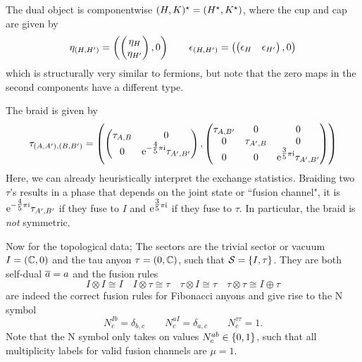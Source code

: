 The dual object is componentwise $\dualspace{\fermpair{H}{K}} = \fermpair{\dualspace{H}}{\dualspace{K}}$, where the cup and cap are given by
\begin{equation}
    \eta_{\fermpair{H}{H'}}
    = \fermpair{\begin{pmatrix}\eta_H \\ \eta_{H'}\end{pmatrix}}{0}
    \qquad
    \epsilon_{\fermpair{H}{H'}}
    = \fermpair{\begin{pmatrix} \epsilon_H & \epsilon_{H'}\end{pmatrix}}{0}
\end{equation}
which is structurally very similar to fermions, but note that the zero maps in the second components have a different type.

The braid is given by
\begin{equation}
    \tau_{\fermpair{A}{A'}, \fermpair{B}{B'}}
    = \fermpair{
        \begin{pmatrix} \tau_{A,B} & 0 \\ 0 & \eto{-\tfrac{4}{5}\pi\im} \tau_{A',B'} \end{pmatrix}
    }{
        \begin{pmatrix} \tau_{A,B'} & 0 & 0\\ 0 & \tau_{A',B} & 0 \\ 0 & 0 & \eto{\tfrac{3}{5}\pi\im} \tau_{A',B'} \end{pmatrix}
    }
\end{equation}
Here, we can already heuristically interpret the exchange statistics.
%
Braiding two $\tau$'s results in a phase that depends on the joint state or ``fusion channel", it is $\mathrm{e}^{-\tfrac{4}{5}\pi\mathrm{i}} \tau_{A',B'}$ if they fuse to $I$ and $\mathrm{e}^{\tfrac{3}{5}\pi\mathrm{i}}$ if they fuse to $\tau$.
%
In particular, the braid is \emph{not} symmetric.

Now for the topological data;
%
The sectors are the trivial sector or vacuum $I = \fermpair{\Cbb}{0}$ and the tau anyon $\tau = \fermpair{0}{\Cbb}$, such that $\mathcal{S} = \set{I, \tau}$.
%
They are both self-dual $\overline{a} = a$ and the fusion rules
\begin{equation}
    I \otimes I \cong I
    \quad 
    I \otimes \tau \cong \tau
    \quad 
    \tau \otimes I \cong \tau
    \quad 
    \tau \otimes \tau \cong I \oplus \tau
\end{equation}
are indeed the correct fusion rules for Fibonacci anyons and give rise to the N symbol
\begin{equation}
    N^{Ib}_c = \delta_{b,c} \qquad N^{aI}_c = \delta_{a,c} \qquad N^{\tau\tau}_c = 1
    .
\end{equation}
Note that the N symbol only takes on values $N^{ab}_c \in \set{0, 1}$, such that all multiplicity labels for valid fusion channels are $\mu=1$.

